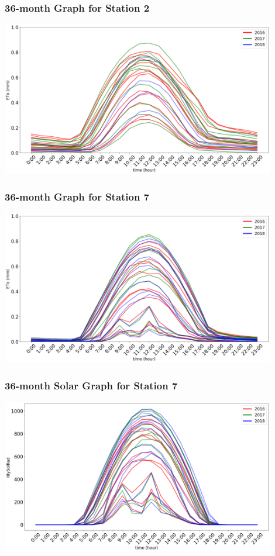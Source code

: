 \begin{frame}
\frametitle{36-month Graph for Station 2}
\centering
\includegraphics[width=0.9\textwidth]{images/234multi.png}
\end{frame}



\begin{frame}
\frametitle{36-month Graph for Station 7}
\centering
\includegraphics[width=0.9\textwidth]{images/7multi.png}
\end{frame}


\begin{frame}
\frametitle{36-month Solar Graph for Station 7}
\centering
\includegraphics[width=0.9\textwidth]{images/3year7solar.png}
\end{frame}



